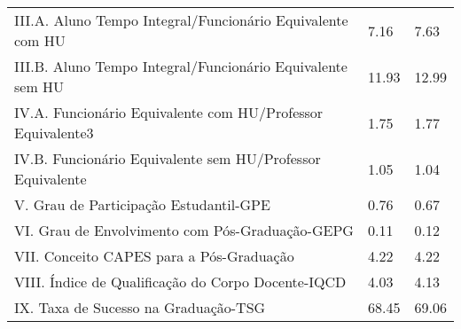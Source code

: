 \documentclass{report}
\begin{document}
\begin{tabular}{lll}
III.A. Aluno Tempo Integral/Funcionário Equivalente com HU  &  7.16 &  7.63 \\
III.B. Aluno Tempo Integral/Funcionário Equivalente sem HU  &  11.93 &  12.99 \\
IV.A. Funcionário Equivalente com HU/Professor Equivalente3 &  1.75 &  1.77 \\
IV.B. Funcionário Equivalente sem HU/Professor Equivalente  &  1.05 &  1.04 \\
V. Grau de Participação Estudantil-GPE                      &  0.76 &  0.67 \\
VI. Grau de Envolvimento com Pós-Graduação-GEPG             &  0.11 &  0.12 \\
VII. Conceito CAPES para a Pós-Graduação                    &  4.22 &  4.22 \\
VIII. Índice de Qualificação do Corpo Docente-IQCD          &  4.03 &  4.13 \\
IX. Taxa de Sucesso na Graduação-TSG                        &  68.45 &  69.06 \\
\bottomrule
\end{tabular}
\newpage
\end{document}
